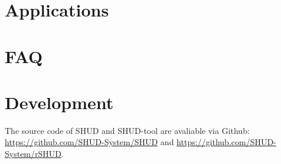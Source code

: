 \documentclass[
]{gitbook}
\begin{document}
\hypertarget{app}{%
\section{Applications}\label{app}}

\hypertarget{faq}{%
\section{FAQ}\label{faq}}

\hypertarget{dev}{%
\section{Development}\label{dev}}

The source code of SHUD and SHUD-tool are avaliable via Github: \url{https://github.com/SHUD-System/SHUD} and \url{https://github.com/SHUD-System/rSHUD}.

  
\end{document}

